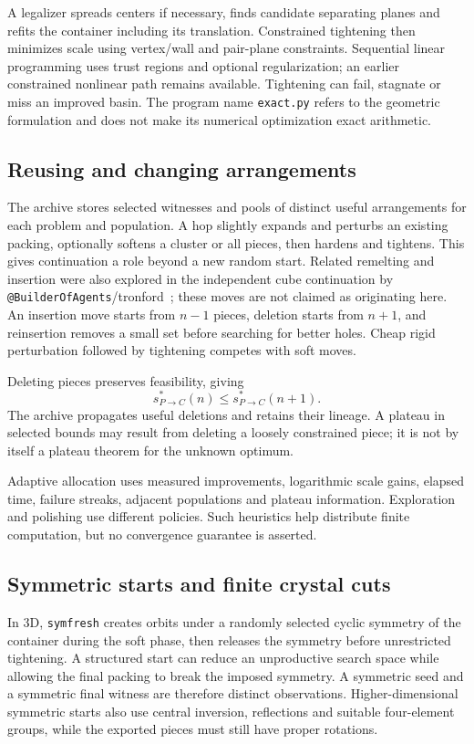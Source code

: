 \documentclass[11pt,a4paper]{article}
\newcommand{\code}[1]{\texttt{\nolinkurl{#1}}}
\begin{document}
A legalizer spreads centers if necessary, finds candidate separating planes and refits the container including its translation. Constrained tightening then minimizes scale using vertex/wall and pair-plane constraints. Sequential linear programming uses trust regions and optional regularization; an earlier constrained nonlinear path remains available. Tightening can fail, stagnate or miss an improved basin. The program name \code{exact.py} refers to the geometric formulation and does not make its numerical optimization exact arithmetic.

\subsection{Reusing and changing arrangements}
The archive stores selected witnesses and pools of distinct useful arrangements for each problem and population. A hop slightly expands and perturbs an existing packing, optionally softens a cluster or all pieces, then hardens and tightens. This gives continuation a role beyond a new random start. Related remelting and insertion were also explored in the independent cube continuation by \code{@BuilderOfAgents}/tronford~\cite{tronford}; these moves are not claimed as originating here. An insertion move starts from $n-1$ pieces, deletion starts from $n+1$, and reinsertion removes a small set before searching for better holes. Cheap rigid perturbation followed by tightening competes with soft moves.

Deleting pieces preserves feasibility, giving
\begin{equation}\label{eq:monotone}
s^*_{P\to C}(n)\leq s^*_{P\to C}(n+1).
\end{equation}
The archive propagates useful deletions and retains their lineage. A plateau in selected bounds may result from deleting a loosely constrained piece; it is not by itself a plateau theorem for the unknown optimum.

Adaptive allocation uses measured improvements, logarithmic scale gains, elapsed time, failure streaks, adjacent populations and plateau information. Exploration and polishing use different policies. Such heuristics help distribute finite computation, but no convergence guarantee is asserted.

\subsection{Symmetric starts and finite crystal cuts}
In 3D, \code{symfresh} creates orbits under a randomly selected cyclic symmetry of the container during the soft phase, then releases the symmetry before unrestricted tightening. A structured start can reduce an unproductive search space while allowing the final packing to break the imposed symmetry. A symmetric seed and a symmetric final witness are therefore distinct observations. Higher-dimensional symmetric starts also use central inversion, reflections and suitable four-element groups, while the exported pieces must still have proper rotations.
\end{document}
